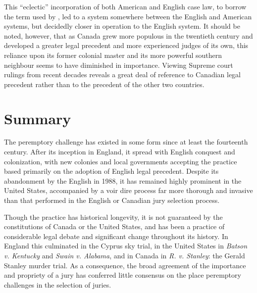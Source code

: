 This ``eclectic'' incorporation of both American and English case law, to borrow the term used by \cite{brown2000}, led to a
system somewhere between the English and American systems, but decidedly closer in operation to the English system. It should be
noted, however, that as Canada grew more populous in the twentieth century and developed a greater legal precedent and more
experienced judges of its own, this reliance upon its former colonial master and its more powerful southern neighbour seems to
have diminished in importance. Viewing Supreme court rulings from recent decades reveals a great deal of reference to Canadian
legal precedent rather than to the precedent of the other two countries.

\section{Summary}

The peremptory challenge has existed in some form since at least the fourteenth century. After its inception in England, it spread
with English conquest and colonization, with new colonies and local governments accepting the practice based primarily on the
adoption of English legal precedent. Despite its abandonment by the English in 1988, it has remained highly prominent in the
United States, accompanied by a voir dire process far more thorough and invasive than that performed in the English or Canadian
jury selection process.

Though the practice has historical longevity, it is not guaranteed by the constitutions of Canada or the United States, and has
been a practice of considerable legal debate and significant change throughout its history. In England this culminated in the
Cyprus sky trial, in the United States in \textit{Batson v. Kentucky} and \textit{Swain v. Alabama}, and in Canada in
\textit{R. v. Stanley}: the Gerald Stanley  murder trial. As a consequence, the broad agreement of the importance and propriety of
a jury has conferred little consensus on the place peremptory challenges in the selection of juries.